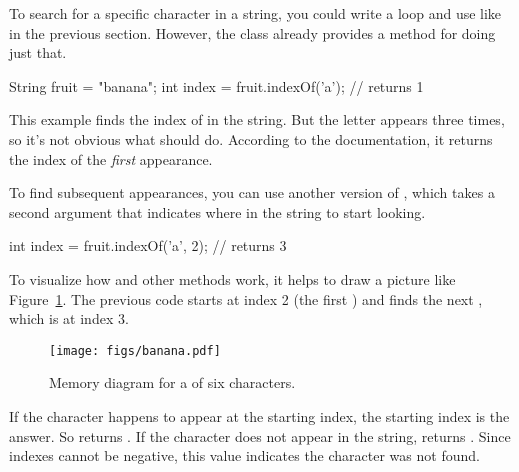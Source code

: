 
To search for a specific character in a string, you could write a  loop and use  like in the previous section.
However, the  class already provides a method for doing just that.

\begin{code}
String fruit = "banana";
int index = fruit.indexOf('a');     // returns 1
\end{code}

This example finds the index of  in the string.
But the letter appears three times, so it's not obvious what  should do.
According to the documentation, it returns the index of the {\em first} appearance.

To find subsequent appearances, you can use another version of , which takes a second argument that indicates where in the string to start looking.

\begin{code}
int index = fruit.indexOf('a', 2);  // returns 3
\end{code}

To visualize how  and other  methods work, it helps to draw a picture like Figure~\ref{fig.banana}.
The previous code starts at index 2 (the first ) and finds the next , which is at index 3.


\begin{figure}[!ht]
\begin{center}
\texttt{[image: figs/banana.pdf]}
\caption{Memory diagram for a  of six characters.}
\label{fig.banana}
\end{center}
\end{figure}


If the character happens to appear at the starting index, the starting index is the answer.
So  returns .
If the character does not appear in the string,  returns .
Since indexes cannot be negative, this value indicates the character was not found.

